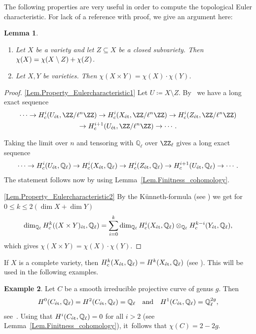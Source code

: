 \documentclass[JEP,XML,SOM,Unicode,NoFloatCountersInSection,published]{cedram}
\newcommand\quand{\quad\text{and}\quad}
\newtheorem{lemma}{Lemma}[section]
\theoremstyle{definition}
\newtheorem{example}[lemma]{Example}
\newcommand\QQ{{\mathbb Q}}
\newcommand{\et}{\textup{ét}}
\begin{document}
The following properties are very useful in order to compute the topological Euler characteristic.
For lack of
a reference with proof, we give an argument here:
\skpt
\begin{lemma}
\label{Lem.Property_Eulercharacteristic}
\begin{enumerate}
\item \label{Lem.Property_Eulercharacteristic1} Let $X$ be a variety and let $Z \subseteq X$ be a closed subvariety. Then
$\chi(X) = \chi(X \setminus\nobreak Z) + \chi(Z)$.
\item \label{Lem.Property_Eulercharacteristic2} Let $X, Y$ be varieties. Then $\chi(X \times Y) = \chi(X) \cdot \chi(Y)$.
\end{enumerate}
\end{lemma}

\skpt
\begin{proof}
\eqref{Lem.Property_Eulercharacteristic1}
Let $U \coloneqq X \setminus Z$.
By~\cite[Ch.\,XVII, \S5.1.16]{1973Theorie-des-topos-} we have a long exact sequence
\begin{multline*}
\cdots \to H^{i}_c(U_{\et}, \ZZ/ \ell^n \ZZ) \to H^{i}_c(X_{\et}, \ZZ/ \ell^n \ZZ) \to H^{i}_c(Z_{\et}, \ZZ/ \ell^n \ZZ) \\
\to H^{i+1}_c(U_{\et}, \ZZ/ \ell^n \ZZ) \to \cdots.
\end{multline*}

Taking the limit over $n$
and tensoring with $\QQ_{\ell}$ over $\ZZ_{\ell}$
gives a long exact sequence
\[
\cdots \to H^{i}_c(U_{\et}, \QQ_{\ell}) \to H^{i}_c(X_{\et}, \QQ_{\ell}) \to H^{i}_c(Z_{\et}, \QQ_{\ell}) \to
H^{i+1}_c(U_{\et}, \QQ_{\ell}) \to \cdots.
\]
The statement follows now by using Lemma~\ref{Lem.Finitness_cohomology}.

\eqref{Lem.Property_Eulercharacteristic2}
By the Künneth-formula
(see \cite[Ch.\,VI, Cor.\,8.23]{Mi1980Etale-cohomology})
we get for $0 \leq k \leq 2(\dim X + \dim Y)$
\[
\dim_{\QQ_\ell} H^k_c((X \times Y)_{\et}, \QQ_\ell)
= \sum_{i=0}^k \dim_{\QQ_\ell} H^i_c(X_{\et}, \QQ_\ell) \otimes_{\QQ_{\ell}} H^{k-i}_c(Y_{\et}, \QQ_\ell),
\]
which gives $\chi(X \times Y) = \chi(X) \cdot \chi(Y)$.
\end{proof}

If $X$ is a complete variety, then $H^k_c(X_{\et}, \QQ_\ell) = H^k(X_{\et}, \QQ_\ell)$
(see \eg \cite[Def.\,18.1]{Mi2013Lectures-on-Etale-}). This will be used in
the following examples.

\begin{example}
\label{Exa.Smooth_curve}
Let $C$ be a smooth irreducible projective curve of genus $g$. Then
\[
H^0(C_{\et}, \QQ_\ell) = H^2(C_{\et}, \QQ_\ell) = \QQ_{\ell} \quand H^1(C_{\et}, \QQ_\ell) = \QQ_{\ell}^{2g},
\]
see~\cite[Prop.\,14.2]{Mi2013Lectures-on-Etale-}. Using that $H^i(C_{\et}, \QQ_\ell) = 0$ for all $i > 2$
(see Lemma~\ref{Lem.Finitness_cohomology}), it~follows that $\chi(C) = 2-2g$.
\end{example}
\end{document}
